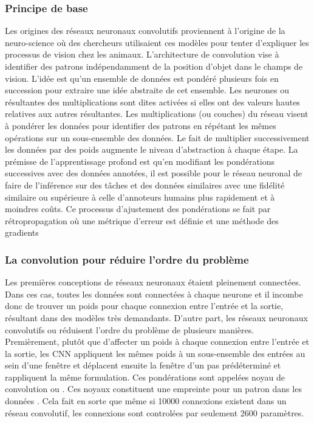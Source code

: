     \subsubsection{Principe de base}
    Les origines des réseaux neuronaux convolutifs proviennent à l'origine de la neuro-science où des chercheurs utilisaient ces modèles pour tenter d'expliquer les processus de vision \parencite{fukushima_neocognitron_1980} chez les animaux. L'architecture de convolution vise à identifier des patrons indépendamment de la position d'objet dans le champs de vision. L'idée est qu'un ensemble de données est pondéré plusieurs fois en succession pour extraire une idée abstraite de cet ensemble. Les neurones ou résultantes des multiplications sont dites activées si elles ont des valeurs hautes relatives aux autres résultantes. Les multiplications (ou couches) du réseau visent à pondérer les données pour identifier des patrons en répétant les mêmes opérations sur un sous-ensemble des données. Le fait de multiplier successivement les données par des poids augmente le niveau d'abstraction à chaque étape. La prémisse de l'apprentissage profond est qu'en modifiant les pondérations successives avec des données annotées, il est possible pour le réseau neuronal de faire de l'inférence sur des tâches et des données similaires avec une fidélité similaire ou supérieure à celle d'annoteurs humains plus rapidement et à moindres coûts. Ce processus d'ajustement des pondérations se fait par rétropropagation où une métrique d'erreur est définie et une méthode des gradients \parencite{rumelhart_learning_1986}\par
     \subsubsection{La convolution pour réduire l'ordre du problème}
    Les premières conceptions de réseaux neuronaux étaient pleinement connectées. Dans ces cas, toutes les données sont connectées à chaque neurone et il incombe donc de trouver un poids pour chaque connexion entre l'entrée et la sortie, résultant dans des modèles très demandants. D'autre part,  les réseaux neuronaux convolutifs ou \fg{} réduisent l'ordre du problème de plusieurs manières. Premièrement, plutôt que d'affecter un poids à chaque connexion entre l'entrée et la sortie, les \ac{CNN} appliquent les mêmes poids à un sous-ensemble des entrées au sein d'une fenêtre et déplacent ensuite la fenêtre d'un pas prédéterminé et rappliquent la même formulation. Ces pondérations sont appelées noyau de convolution ou  \fg. Ces noyaux constituent une empreinte pour un patron dans les données \parencite{lecun_convolutional_1995}. Cela fait en sorte que même si 10000 connexions existent dans un réseau convolutif, les connexions sont controlées par seulement 2600 paramètres.\par
